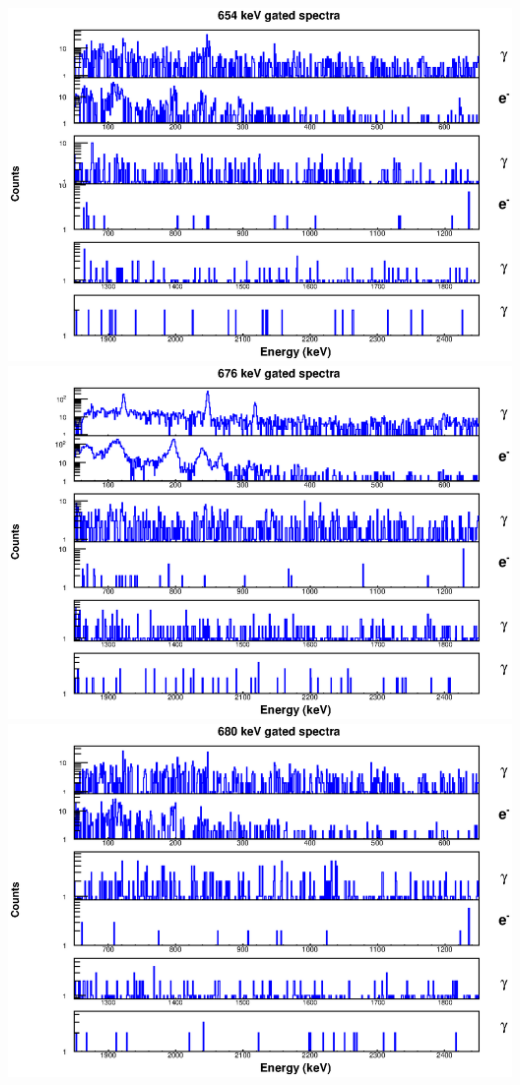 \includegraphics[scale=0.8]{154Gd_Appendix/654_combined.eps}
\includegraphics[scale=0.8]{154Gd_Appendix/676_combined.eps}
\includegraphics[scale=0.8]{154Gd_Appendix/680_combined.eps}
